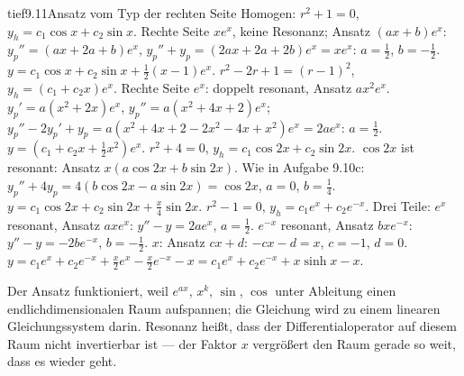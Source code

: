 \begin{loesungkarte}{tief}{9.11}{Ansatz vom Typ der rechten Seite}
Homogen: $r^{2} + 1 = 0$, $y_h = c_1\cos x + c_2\sin x$. Rechte Seite $xe^{x}$, keine Resonanz; Ansatz $(ax + b)e^{x}$: $y_p'' = (ax + 2a + b)e^{x}$, $y_p'' + y_p = (2ax + 2a + 2b)e^{x} = xe^{x}$: $a = \frac12$, $b = -\frac12$. $y = c_1\cos x + c_2\sin x + \frac12(x - 1)e^{x}$.
$r^{2} - 2r + 1 = (r - 1)^{2}$, $y_h = (c_1 + c_2x)e^{x}$. Rechte Seite $e^{x}$: doppelt resonant, Ansatz $ax^{2}e^{x}$. $y_p' = a(x^{2} + 2x)e^{x}$, $y_p'' = a(x^{2} + 4x + 2)e^{x}$; $y_p'' - 2y_p' + y_p = a(x^{2} + 4x + 2 - 2x^{2} - 4x + x^{2})e^{x} = 2ae^{x}$: $a = \frac12$. $y = (c_1 + c_2x + \frac12x^{2})e^{x}$.
$r^{2} + 4 = 0$, $y_h = c_1\cos2x + c_2\sin2x$. $\cos2x$ ist resonant: Ansatz $x(a\cos2x + b\sin2x)$. Wie in Aufgabe 9.10c: $y_p'' + 4y_p = 4(b\cos2x - a\sin2x) = \cos2x$, $a = 0$, $b = \frac14$. $y = c_1\cos2x + c_2\sin2x + \frac x4\sin2x$.
$r^{2} - 1 = 0$, $y_h = c_1e^{x} + c_2e^{-x}$. Drei Teile: $e^{x}$ resonant, Ansatz $axe^{x}$: $y'' - y = 2ae^{x}$, $a = \frac12$. $e^{-x}$ resonant, Ansatz $bxe^{-x}$: $y'' - y = -2be^{-x}$, $b = -\frac12$. $x$: Ansatz $cx + d$: $-cx - d = x$, $c = -1$, $d = 0$. $y = c_1e^{x} + c_2e^{-x} + \frac x2e^{x} - \frac x2e^{-x} - x = c_1e^{x} + c_2e^{-x} + x\sinh x - x$.
\begin{mitnehmen}\kastentext
Der Ansatz funktioniert, weil $e^{ax}$, $x^{k}$, $\sin$, $\cos$ unter Ableitung einen endlichdimensionalen Raum aufspannen; die Gleichung wird zu einem linearen Gleichungssystem darin. Resonanz heißt, dass der Differentialoperator auf diesem Raum nicht invertierbar ist --- der Faktor $x$ vergrößert den Raum gerade so weit, dass es wieder geht.
\end{mitnehmen}
\end{loesungkarte}

